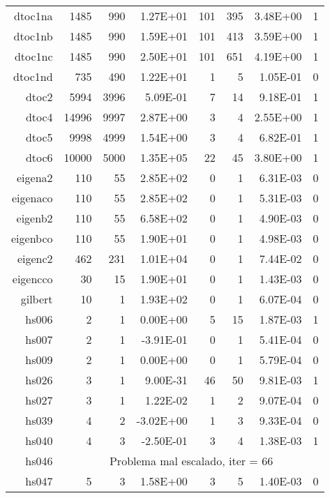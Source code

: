 \documentclass[12pt]{article}
\begin{document}
\begin{center}
\begin{longtable}[htbp]{rrrrrrrr}
    dtoc1na & 1485  & 990   & 1.27E+01 & 101   & 395   & 3.48E+00 & 1 \\
    dtoc1nb & 1485  & 990   & 1.59E+01 & 101   & 413   & 3.59E+00 & 1 \\
    dtoc1nc & 1485  & 990   & 2.50E+01 & 101   & 651   & 4.19E+00 & 1 \\
    dtoc1nd & 735   & 490   & 1.22E+01 & 1     & 5     & 1.05E-01 & 0 \\
    dtoc2 & 5994  & 3996  & 5.09E-01 & 7     & 14    & 9.18E-01 & 1 \\
    dtoc4 & 14996 & 9997  & 2.87E+00 & 3     & 4     & 2.55E+00 & 1 \\
    dtoc5 & 9998  & 4999  & 1.54E+00 & 3     & 4     & 6.82E-01 & 1 \\
    dtoc6 & 10000 & 5000  & 1.35E+05 & 22    & 45    & 3.80E+00 & 1 \\
    eigena2 & 110   & 55    & 2.85E+02 & 0     & 1     & 6.31E-03 & 0 \\
    eigenaco & 110   & 55    & 2.85E+02 & 0     & 1     & 5.31E-03 & 0 \\
    eigenb2 & 110   & 55    & 6.58E+02 & 0     & 1     & 4.90E-03 & 0 \\
    eigenbco & 110   & 55    & 1.90E+01 & 0     & 1     & 4.98E-03 & 0 \\
    eigenc2 & 462   & 231   & 1.01E+04 & 0     & 1     & 7.44E-02 & 0 \\
    eigencco & 30    & 15    & 1.90E+01 & 0     & 1     & 1.43E-03 & 0 \\
    gilbert & 10    & 1     & 1.93E+02 & 0     & 1     & 6.07E-04 & 0 \\
    hs006 & 2     & 1     & 0.00E+00 & 5     & 15    & 1.87E-03 & 1 \\
    hs007 & 2     & 1     & -3.91E-01 & 0     & 1     & 5.41E-04 & 0 \\
    hs009 & 2     & 1     & 0.00E+00 & 0     & 1     & 5.79E-04 & 0 \\
    hs026 & 3     & 1     & 9.00E-31 & 46    & 50    & 9.81E-03 & 1 \\
    hs027 & 3     & 1     & 1.22E-02 & 1     & 2     & 9.07E-04 & 0 \\
    hs039 & 4     & 2     & -3.02E+00 & 1     & 3     & 9.33E-04 & 0 \\
    hs040 & 4     & 3     & -2.50E-01 & 3     & 4     & 1.38E-03 & 1 \\
    hs046 & \multicolumn{7}{c}{Problema mal escalado, iter = 66} \\
    hs047 & 5     & 3     & 1.58E+00 & 3     & 5     & 1.40E-03 & 0 \\

\end{longtable}
\end{center}
\end{document}
